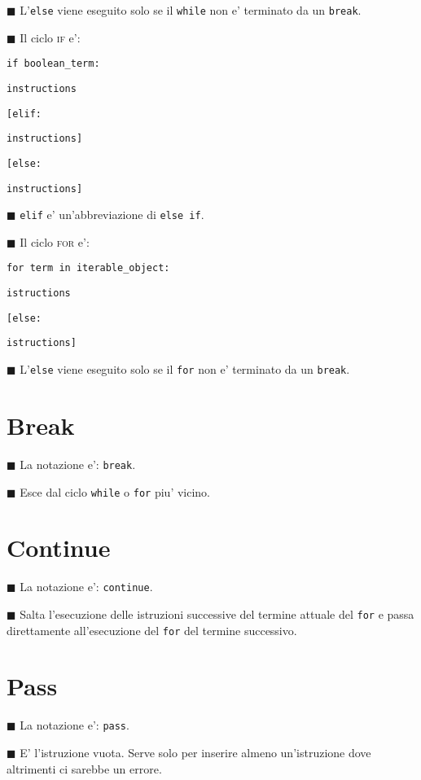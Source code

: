 \documentclass[a4paper,12pt,fleqn,leqno,twoside]{article}
\newcommand{\tw}{\texttt} %
\renewcommand{\sc}{\textsc} %
\newcommand{\bbox}{{\scriptsize $\blacksquare$}} %
\newcommand{\skipline}{\vspace{\baselineskip}} %
\newcommand{\bitem}[1]{\bbox \; #1\par \skipline}
\begin{document}
\bitem{L'\tw{else} viene eseguito solo se il \tw{while} non e' terminato da un \tw{break}.}

\bitem{Il ciclo \sc{if} e':}

\tw{if boolean\_term:}\par
\tw{\qquad instructions}\par
\tw{[elif:}\par
\tw{\qquad instructions]}\par
\tw{[else:}\par
\tw{\qquad instructions]}

\skipline

\bitem{\tw{elif} e' un'abbreviazione di \tw{else if}.}

\bitem{Il ciclo \sc{for} e':}

\tw{for term in iterable\_object:}\par
\tw{\qquad istructions}\par
\tw{[else:}\par
\tw{\qquad istructions]}

\skipline

\bitem{L'\tw{else} viene eseguito solo se il \tw{for} non e' terminato da un \tw{break}.}

\section{Break}

\bitem{La notazione e': \tw{break}.}

\bitem{Esce dal ciclo \tw{while} o \tw{for} piu' vicino.}

\section{Continue}

\bitem{La notazione e': \tw{continue}.}

\bitem{Salta l'esecuzione delle istruzioni successive del termine attuale del \tw{for} e passa direttamente all'esecuzione del \tw{for} del termine successivo.}

\section{Pass}

\bitem{La notazione e': \tw{pass}.}

\bitem{E' l'istruzione vuota. Serve solo per inserire almeno un'istruzione dove altrimenti ci sarebbe un errore.}
\end{document}
